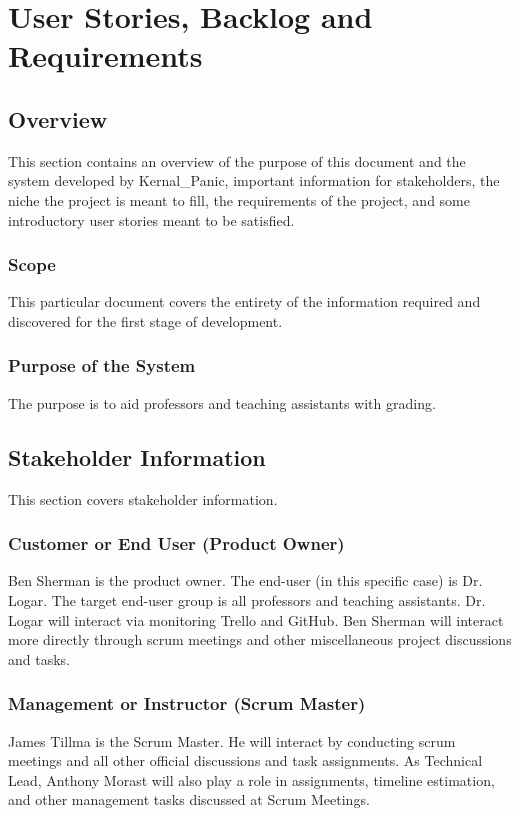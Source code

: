 \chapter{User Stories, Backlog and Requirements}
\section{Overview} 

This section contains an overview of the purpose of this document and the system developed by Kernal\_Panic, important information for stakeholders, the niche the project is meant to fill, the requirements of the project, and some introductory user stories meant to be satisfied.





\subsection{Scope}
This particular document covers the entirety of the information required and discovered for the first stage of development.


\subsection{Purpose of the System}
The purpose is to aid professors and teaching assistants with grading.


\section{ Stakeholder Information}
This section covers stakeholder information. 


\subsection{Customer or End User (Product Owner)}
Ben Sherman is the product owner. The end-user (in this specific case) is Dr. Logar. The target end-user group is all professors and teaching assistants. Dr. Logar will interact via monitoring Trello and GitHub. Ben Sherman will interact more directly through scrum meetings and other miscellaneous project discussions and tasks.

\subsection{Management or Instructor (Scrum Master)}
James Tillma is the Scrum Master. He will interact by conducting scrum meetings and all other official discussions and task assignments. As Technical Lead, Anthony Morast will also play a role in assignments, timeline estimation, and other management tasks discussed at Scrum Meetings.


